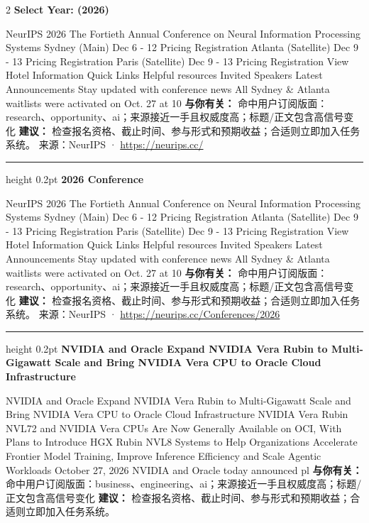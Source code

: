 \documentclass[10.5pt]{ctexart}
\begin{document}
\begin{multicols}{2}
{\large\bfseries Select Year: (2026)}\par
NeurIPS 2026 The Fortieth Annual Conference on Neural Information Processing Systems Sydney (Main) Dec 6 - 12 Pricing Registration Atlanta (Satellite) Dec 9 - 13 Pricing Registration Paris (Satellite) Dec 9 - 13 Pricing Registration View Hotel Information Quick Links Helpful resources Invited Speakers Latest Announcements Stay updated with conference news All Sydney \& Atlanta waitlists were activated on Oct. 27 at 10
\textbf{与你有关：} 命中用户订阅版面：research、opportunity、ai；来源接近一手且权威度高；标题/正文包含高信号变化
\textbf{建议：} 检查报名资格、截止时间、参与形式和预期收益；合适则立即加入任务系统。
{\footnotesize\color{ormuted} 来源：NeurIPS · \url{https://neurips.cc/}}
\vspace{2mm}
\hrule height 0.2pt
\vspace{2mm}
{\large\bfseries 2026 Conference}\par
NeurIPS 2026 The Fortieth Annual Conference on Neural Information Processing Systems Sydney (Main) Dec 6 - 12 Pricing Registration Atlanta (Satellite) Dec 9 - 13 Pricing Registration Paris (Satellite) Dec 9 - 13 Pricing Registration View Hotel Information Quick Links Helpful resources Invited Speakers Latest Announcements Stay updated with conference news All Sydney \& Atlanta waitlists were activated on Oct. 27 at 10
\textbf{与你有关：} 命中用户订阅版面：research、opportunity、ai；来源接近一手且权威度高；标题/正文包含高信号变化
\textbf{建议：} 检查报名资格、截止时间、参与形式和预期收益；合适则立即加入任务系统。
{\footnotesize\color{ormuted} 来源：NeurIPS · \url{https://neurips.cc/Conferences/2026}}
\vspace{2mm}
\hrule height 0.2pt
\vspace{2mm}
{\large\bfseries NVIDIA and Oracle Expand NVIDIA Vera Rubin to Multi-Gigawatt Scale and Bring NVIDIA Vera CPU to Oracle Cloud Infrastructure}\par
NVIDIA and Oracle Expand NVIDIA Vera Rubin to Multi-Gigawatt Scale and Bring NVIDIA Vera CPU to Oracle Cloud Infrastructure NVIDIA Vera Rubin NVL72 and NVIDIA Vera CPUs Are Now Generally Available on OCI, With Plans to Introduce HGX Rubin NVL8 Systems to Help Organizations Accelerate Frontier Model Training, Improve Inference Efficiency and Scale Agentic Workloads October 27, 2026 NVIDIA and Oracle today announced pl
\textbf{与你有关：} 命中用户订阅版面：business、engineering、ai；来源接近一手且权威度高；标题/正文包含高信号变化
\textbf{建议：} 检查报名资格、截止时间、参与形式和预期收益；合适则立即加入任务系统。

\end{multicols}
\end{document}
